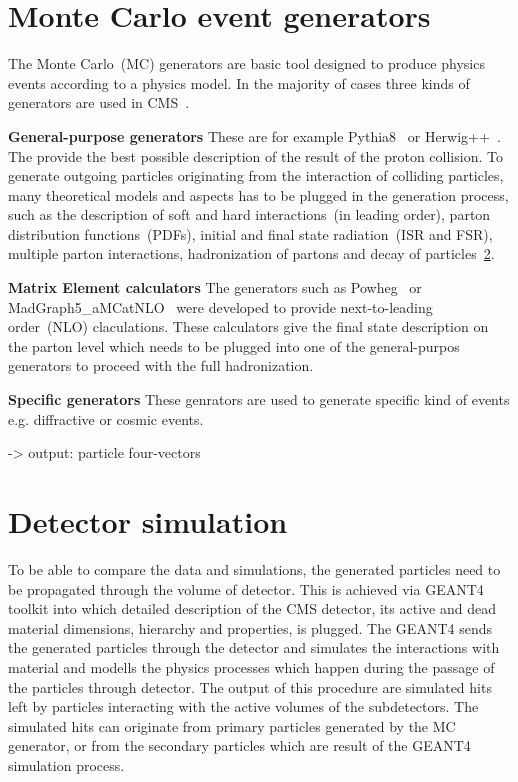 \section{Monte Carlo event generators}

The Monte Carlo~(MC) generators are basic tool designed to produce physics events according to a physics model. In the majority of cases three kinds of generators are used in CMS~\cite{website:generation, website:generationIntro}. 

\textbf{General-purpose generators}
These are for example Pythia8~\cite{Sjostrand:2014zea} or Herwig++~\cite{Bahr:2008pv}. The provide the best possible description of the result of the proton collision. To generate outgoing particles originating from the interaction of colliding particles, many theoretical models and aspects has to be plugged in the generation process, such as the description of soft and hard interactions~(in leading order), parton distribution functions~(PDFs), initial and final state radiation~(ISR and FSR), multiple parton interactions, hadronization of partons and decay of particles~\ref{}.

\textbf{Matrix Element calculators}
The generators such as Powheg~\cite{Oleari:2010nx} or MadGraph5\_aMCatNLO~\cite{Alwall:2014hca} were developed to provide next-to-leading order~(NLO) claculations. These calculators give the final state description on the parton level which needs to be plugged into one of the general-purpos generators to proceed with  the full hadronization.

\textbf{Specific generators}
These genrators are used to generate specific kind of events e.g. diffractive or cosmic events.

-> output: particle four-vectors

\section{Detector simulation}

To be able to compare the data and simulations, the generated particles need  to be propagated through the volume of detector. This is achieved via GEANT4~\cite{Agostinelli:2002hh ,Lefebure:1999wja} toolkit into which detailed description of the CMS detector, its active and dead material dimensions, hierarchy and properties, is plugged. The GEANT4 sends the generated particles through the detector and simulates the interactions with material and modells the physics processes which happen during the passage of the particles through detector. The output of this procedure are simulated hits left by particles interacting with the active volumes of the subdetectors. The simulated hits can originate from primary particles generated by the MC generator, or from the secondary particles which are result of the GEANT4 simulation process.

